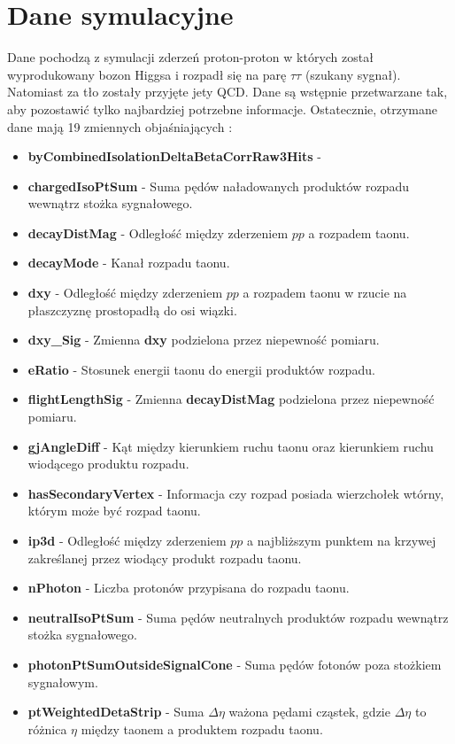 \documentclass{pracalicmgr}
\begin{document}
    \chapter{Dane symulacyjne}
    \label{ch:dane}
    Dane pochodzą z symulacji zderzeń proton-proton w których został wyprodukowany bozon Higgsa i rozpadł się na parę $\tau\tau$ (szukany sygnał). Natomiast za tło zostały przyjęte jety QCD. 
Dane są wstępnie przetwarzane tak, aby pozostawić tylko najbardziej potrzebne informacje. Ostatecznie, otrzymane dane mają 19 zmiennych objaśniających \cite{cms2016reconstruction}:
	\begin{itemize}
	\item \textbf{byCombinedIsolationDeltaBetaCorrRaw3Hits} - %
	\item \textbf{chargedIsoPtSum} - Suma pędów naładowanych produktów rozpadu wewnątrz stożka sygnałowego.
	\item \textbf{decayDistMag} - Odległość między zderzeniem $pp$ a rozpadem taonu.
	\item \textbf{decayMode} - Kanał rozpadu taonu.
	\item \textbf{dxy} - Odległość między zderzeniem $pp$ a rozpadem taonu w rzucie na płaszczyznę prostopadłą do osi wiązki.
	\item \textbf{dxy\_Sig} - Zmienna \textbf{dxy} podzielona przez niepewność pomiaru.
	\item \textbf{eRatio} - Stosunek energii taonu do energii produktów rozpadu.
	\item \textbf{flightLengthSig} - Zmienna \textbf{decayDistMag} podzielona przez niepewność pomiaru. 
	\item \textbf{gjAngleDiff} - Kąt między kierunkiem ruchu taonu oraz kierunkiem ruchu wiodącego produktu rozpadu.
	\item \textbf{hasSecondaryVertex} - Informacja czy rozpad posiada wierzchołek wtórny, którym może być rozpad taonu.
	\item \textbf{ip3d} - Odległość między zderzeniem $pp$ a najbliższym punktem na krzywej zakreślanej przez wiodący produkt rozpadu taonu.
	\item \textbf{nPhoton} - Liczba protonów przypisana do rozpadu taonu.
	\item \textbf{neutralIsoPtSum} - Suma pędów neutralnych produktów rozpadu wewnątrz stożka sygnałowego.
	\item \textbf{photonPtSumOutsideSignalCone} - Suma pędów fotonów poza stożkiem sygnałowym.
	\item \textbf{ptWeightedDetaStrip} - Suma $\Delta\eta$ ważona pędami cząstek, gdzie $\Delta\eta$ to różnica $\eta$ między taonem a produktem rozpadu taonu.

\end{itemize}
\end{document}
